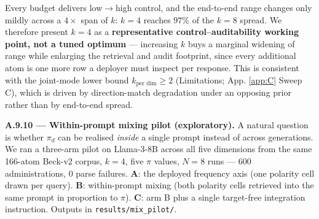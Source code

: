 \begin{table}[t]
\centering
{}
\caption{Atom-budget ablation on Llama-3-8B: five-dimension mean Mini-IPIP score at the two $\pi_d$ endpoints for $k_\text{per dim} \in \{2, 4, 8\}$, $N=10$ runs per cell. Every budget delivers low$\to$high control; spread varies mildly and monotonically with $k$.}
\label{tab:k-ablation}
\end{table}

Every budget delivers low$\to$high control, and the end-to-end range changes only mildly across a $4\times$ span of $k$: $k = 4$ reaches $97\%$ of the $k = 8$ spread. We therefore present $k = 4$ as a \textbf{representative control--auditability working point, not a tuned optimum} --- increasing $k$ buys a marginal widening of range while enlarging the retrieval and audit footprint, since every additional atom is one more row a deployer must inspect per response. This is consistent with the joint-mode lower bound $k_\text{per dim} \geq 2$ (Limitations; App. \ref{app:C} Sweep C), which is driven by direction-match degradation under an opposing prior rather than by end-to-end spread.

\label{app:A.9.10}
\textbf{A.9.10 --- Within-prompt mixing pilot (exploratory).} A natural question is whether $\pi_d$ can be realised \textit{inside} a single prompt instead of across generations. We ran a three-arm pilot on Llama-3-8B across all five dimensions from the same 166-atom Beck-v2 corpus, $k = 4$, five $\pi$ values, $N = 8$ runs --- 600 administrations, 0 parse failures. \textbf{A}: the deployed frequency axis (one polarity cell drawn per query). \textbf{B}: within-prompt mixing (both polarity cells retrieved into the same prompt in proportion to $\pi$). \textbf{C}: arm B plus a single target-free integration instruction. Outputs in \texttt{results/\allowbreak{}mix\_\allowbreak{}pilot/\allowbreak{}}.

